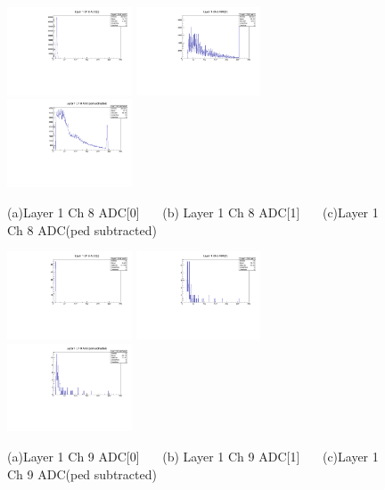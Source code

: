 \documentclass[a4paper,11pt]{article}
\theoremstyle{mytheor}
\begin{document}
\begin{figure}[H] 
\vspace*{-0.3cm} 
\includegraphics[width=0.33\textwidth,scale=0.5,trim=0 0 0 0,clip]{plotsdir/file0_test-Layer1_Ch8_adc0-1.pdf} 
\includegraphics[width=0.33\textwidth,scale=0.5,trim=0 0 0 0,clip]{plotsdir/file0_test-Layer1_Ch8_adc1-1.pdf} 
\includegraphics[width=0.33\textwidth,scale=0.5,trim=0 0 0 0,clip]{plotsdir/file0_test-Layer1_Ch8_adcPedsub-1.pdf} 
\caption{(a)Layer 1 Ch 8 ADC[0] ~~~(b) Layer 1 Ch 8 ADC[1] ~~~(c)Layer 1 Ch 8 ADC(ped subtracted) } 
\end{figure} 
\begin{figure}[H] 
\vspace*{-0.3cm} 
\includegraphics[width=0.33\textwidth,scale=0.5,trim=0 0 0 0,clip]{plotsdir/file0_test-Layer1_Ch9_adc0-1.pdf} 
\includegraphics[width=0.33\textwidth,scale=0.5,trim=0 0 0 0,clip]{plotsdir/file0_test-Layer1_Ch9_adc1-1.pdf} 
\includegraphics[width=0.33\textwidth,scale=0.5,trim=0 0 0 0,clip]{plotsdir/file0_test-Layer1_Ch9_adcPedsub-1.pdf} 
\caption{(a)Layer 1 Ch 9 ADC[0] ~~~(b) Layer 1 Ch 9 ADC[1] ~~~(c)Layer 1 Ch 9 ADC(ped subtracted) } 
\end{figure} 
\end{document}
